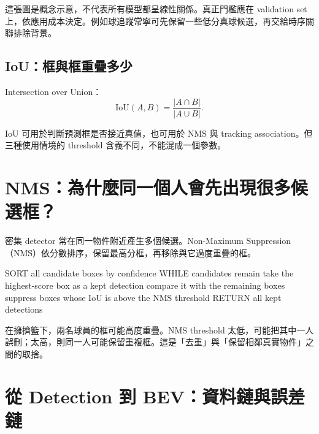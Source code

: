 \documentclass[11pt,a4paper,oneside]{report}
\begin{document}
這張圖是概念示意，不代表所有模型都呈線性關係。真正門檻應在 validation set 上，依應用成本決定。例如球追蹤常寧可先保留一些低分真球候選，再交給時序關聯排除背景。

\subsection{IoU：框與框重疊多少}

Intersection over Union：
\[
\mathrm{IoU}(A,B)=\frac{|A\cap B|}{|A\cup B|}.
\]

IoU 可用於判斷預測框是否接近真值，也可用於 NMS 與 tracking association。但三種使用情境的 threshold 含義不同，不能混成一個參數。

\section{NMS：為什麼同一個人會先出現很多候選框？}

密集 detector 常在同一物件附近產生多個候選。Non-Maximum Suppression（NMS）依分數排序，保留最高分框，再移除與它過度重疊的框。

\begin{pseudoBox}
SORT all candidate boxes by confidence
WHILE candidates remain
  take the highest-score box as a kept detection
  compare it with the remaining boxes
  suppress boxes whose IoU is above the NMS threshold
RETURN all kept detections
\end{pseudoBox}

\begin{riskBox}
在擁擠籃下，兩名球員的框可能高度重疊。NMS threshold 太低，可能把其中一人誤刪；太高，則同一人可能保留重複框。這是「去重」與「保留相鄰真實物件」之間的取捨。
\end{riskBox}

\section{從 Detection 到 BEV：資料鏈與誤差鏈}

\begin{center}
\end{center}
\end{document}
